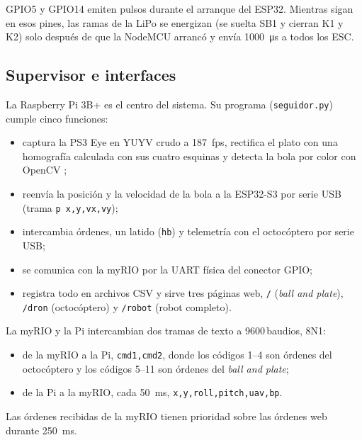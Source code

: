 GPIO5 y GPIO14 emiten pulsos durante el arranque del ESP32. Mientras sigan en esos pines, las ramas de la LiPo se energizan (se suelta SB1 y cierran K1 y K2) solo después de que la NodeMCU arrancó y envía \SI{1000}{\micro\second} a todos los ESC.

\subsection{Supervisor e interfaces}
\label{sec:interfaces}
La Raspberry Pi 3B+ es el centro del sistema. Su programa (\texttt{seguidor.py}) cumple cinco funciones:
\begin{itemize}
  \item captura la PS3 Eye en YUYV crudo a \SI{187}{fps}, rectifica el plato con una homografía calculada con sus cuatro esquinas y detecta la bola por color con OpenCV \cite{bradski2000};
  \item reenvía la posición y la velocidad de la bola a la ESP32-S3 por serie USB (trama \texttt{p x,y,vx,vy});
  \item intercambia órdenes, un latido (\texttt{hb}) y telemetría con el octocóptero por serie USB;
  \item se comunica con la myRIO por la UART física del conector GPIO;
  \item registra todo en archivos CSV y sirve tres páginas web, \texttt{/} (\textit{ball and plate}), \texttt{/dron} (octocóptero) y \texttt{/robot} (robot completo).
\end{itemize}
La myRIO y la Pi intercambian dos tramas de texto a 9600\,baudios, 8N1:
\begin{itemize}
  \item de la myRIO a la Pi, \texttt{cmd1,cmd2}, donde los códigos 1--4 son órdenes del octocóptero y los códigos 5--11 son órdenes del \textit{ball and plate};
  \item de la Pi a la myRIO, cada \SI{50}{\milli\second}, \texttt{x,y,roll,pitch,uav,bp}.
\end{itemize}
Las órdenes recibidas de la myRIO tienen prioridad sobre las órdenes web durante \SI{250}{\milli\second}.


